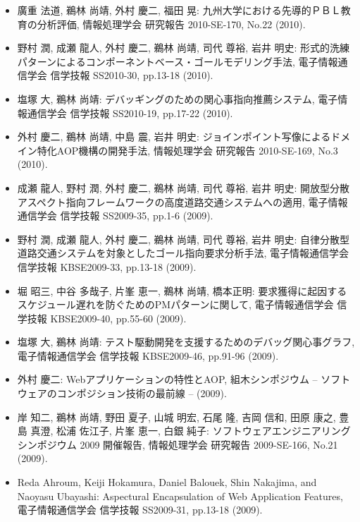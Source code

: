 \documentclass{jarticle}
\begin{document}
\begin{itemize}
\item 廣重 法道, 鵜林 尚靖, 外村 慶二, 福田 晃:
九州大学における先導的ＰＢＬ教育の分析評価,
情報処理学会 研究報告 2010-SE-170, No.22 (2010).

\item 野村 潤, 成瀬 龍人, 外村 慶二, 鵜林 尚靖, 司代 尊裕, 岩井 明史:
形式的洗練パターンによるコンポーネントベース・ゴールモデリング手法,
電子情報通信学会 信学技報 SS2010-30, pp.13-18 (2010).

\item 塩塚 大, 鵜林 尚靖:
デバッギングのための関心事指向推薦システム,
電子情報通信学会 信学技報 SS2010-19, pp.17-22 (2010).

\item 外村 慶二, 鵜林 尚靖, 中島 震, 岩井 明史:
ジョインポイント写像によるドメイン特化AOP機構の開発手法,
情報処理学会 研究報告 2010-SE-169, No.3 (2010).

\item 成瀬 龍人, 野村 潤, 外村 慶二, 鵜林 尚靖, 司代 尊裕, 岩井 明史:
開放型分散アスペクト指向フレームワークの高度道路交通システムへの適用,
電子情報通信学会 信学技報 SS2009-35, pp.1-6 (2009).

\item 野村 潤, 成瀬 龍人, 外村 慶二, 鵜林 尚靖, 司代 尊裕, 岩井 明史:
自律分散型道路交通システムを対象としたゴール指向要求分析手法,
電子情報通信学会 信学技報 KBSE2009-33, pp.13-18 (2009).

\item 堀 昭三, 中谷 多哉子, 片峯 恵一, 鵜林 尚靖, 橋本正明:
要求獲得に起因するスケジュール遅れを防ぐためのPMパターンに関して,
電子情報通信学会 信学技報 KBSE2009-40, pp.55-60 (2009).

\item 塩塚 大, 鵜林 尚靖:
テスト駆動開発を支援するためのデバッグ関心事グラフ,
電子情報通信学会 信学技報 KBSE2009-46, pp.91-96 (2009).

\item 外村 慶二:
Webアプリケーションの特性とAOP,
組木シンポジウム -- ソフトウェアのコンポジション技術の最前線 -- (2009).

\item 岸 知二, 鵜林 尚靖, 野田 夏子, 山城 明宏, 石尾 隆, 吉岡 信和, 田原 康之, 豊島 真澄, 松浦 佐江子, 片峯 恵一, 白銀 純子:
ソフトウェアエンジニアリングシンポジウム 2009 開催報告,
情報処理学会 研究報告 2009-SE-166, No.21 (2009).

\item Reda Ahroum, Keiji Hokamura, Daniel Balouek, Shin Nakajima, and Naoyasu Ubayashi:
Aspectural Encapsulation of Web Application Features,
電子情報通信学会 信学技報 SS2009-31, pp.13-18 (2009).


\end{itemize}
\end{document}
